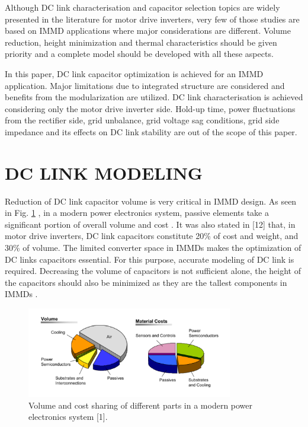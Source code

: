 \documentclass[conference,a4paper,twocolumn]{IEEEtran}
\begin{document}
Although DC link characterisation and capacitor selection topics are widely presented in the literature for motor drive inverters, very few of those studies are based on IMMD applications where major considerations are different. Volume reduction, height minimization and thermal characteristics should be given priority and a complete model should be developed with all these aspects.

In this paper, DC link capacitor optimization is achieved for an IMMD application. Major limitations due to integrated structure are considered and benefits from the modularization are utilized. DC link characterisation is achieved considering only the motor drive inverter side. Hold-up time, power fluctuations from the rectifier side, grid unbalance, grid voltage sag conditions, grid side impedance and its effects on DC link stability are out of the scope of this paper.


\section{DC LINK MODELING}


Reduction of DC link capacitor volume is very critical in IMMD design. As seen in Fig. \ref{fig2} , in a modern power electronics system, passive elements take a significant portion of overall volume and cost \cite{LoCalzo2016}. It was also stated in [12] that, in motor drive inverters, DC link capacitors constitute 20\% of cost and weight, and 30\% of volume. The limited converter space in IMMDs makes the optimization of DC links capacitors essential. For this purpose, accurate modeling of DC link is required. Decreasing the volume of capacitors is not sufficient alone, the height of the capacitors should also be minimized as they are the tallest components in IMMDs \cite{Wang2013,Wang2015b}.

\begin{figure}[h]
  \centering
  \includegraphics[width=9cm]{fig2}
  \caption{Volume and cost sharing of different parts in a modern power electronics system [1].}
  \label{fig2}
\end{figure}
\end{document}

